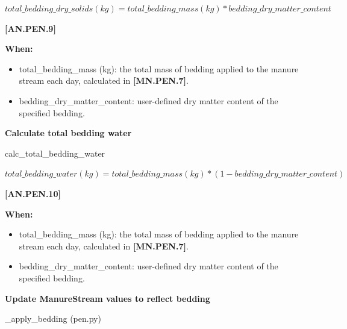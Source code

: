 \begin{refsection}
    \begin{center}
        \(total\_bedding\_dry\_solids (kg) = total\_bedding\_mass (kg) * bedding\_dry\_matter\_content  \)
    \end{center}
        \vspace{0.5cm}
    
            {\raggedleft \textbf{[AN.PEN.9]}\par}
            \vspace{0.5cm}

\textbf{When:}
    \begin{itemize}
        \item total\_bedding\_mass (kg): the total mass of bedding applied to the manure stream each day, calculated in \textbf{[MN.PEN.7]}.
        \item bedding\_dry\_matter\_content: user-defined dry matter content of the specified bedding.

    \end{itemize}

\textbf{Calculate total bedding water}
\vspace{ 0.25cm}

calc\_total\_bedding\_water

\vspace{0.2cm}

    \begin{center}
        \(total\_bedding\_water (kg) = total\_bedding\_mass (kg) * (1 - bedding\_dry\_matter\_content) \)
    \end{center}
        \vspace{0.5cm}
    
            {\raggedleft \textbf{[AN.PEN.10]}\par}

\textbf{When:}
    \begin{itemize}
        \item total\_bedding\_mass (kg): the total mass of bedding applied to the manure stream each day, calculated in \textbf{[MN.PEN.7]}.
        \item bedding\_dry\_matter\_content: user-defined dry matter content of the specified bedding.

    \end{itemize}
    \vspace{0.5cm}

\textbf{Update ManureStream values to reflect bedding}
\vspace{0.15cm}

\_apply\_bedding (pen.py)
\vspace{0.2cm}


\end{refsection}
